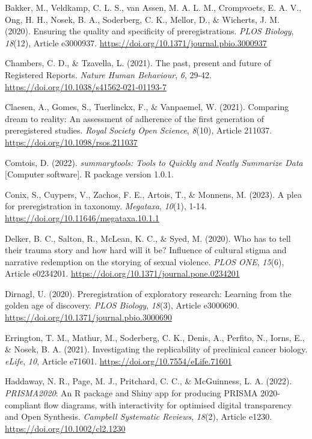 \documentclass[authordate, meta]{jote-new-article}
\begin{document}
	\indent Bakker, M., Veldkamp, C. L. S., van Assen, M. A. L. M., Crompvoets, E. A. V., Ong, H. H., Nosek, B. A., Soderberg, C. K., Mellor, D., \& Wicherts, J. M. (2020). Ensuring the quality and specificity of preregistrations. \emph{PLOS Biology}, \emph{18}(12), Article e3000937. \url{https://doi.org/10.1371/journal.pbio.3000937}



	Chambers, C. D., \& Tzavella, L. (2021). The past, present and future of Registered Reports. \emph{Nature Human Behaviour}, \emph{6}, 29-42. \url{https://doi.org/10.1038/s41562-021-01193-7}



	Claesen, A., Gomes, S., Tuerlinckx, F., \& Vanpaemel, W. (2021). Comparing dream to reality: An assessment of adherence of the first generation of preregistered studies. \emph{Royal Society Open Science}, \emph{8}(10), Article 211037. \url{https://doi.org/10.1098/rsos.211037}



	Comtois, D. (2022). \emph{summarytools: Tools to Quickly and Neatly Summarize Data} [Computer software]. R package version 1.0.1.



	Conix, S., Cuypers, V., Zachos, F. E., Artois, T., \& Monnens, M. (2023). A plea for preregistration in taxonomy. \emph{Megataxa}, \emph{10}(1), 1-14. \url{https://doi.org/10.11646/megataxa.10.1.1}



	Delker, B. C., Salton, R., McLean, K. C., \& Syed, M. (2020). Who has to tell their trauma story and how hard will it be? Influence of cultural stigma and narrative redemption on the storying of sexual violence. \emph{PLOS ONE}, \emph{15}(6), Article e0234201. \url{https://doi.org/10.1371/journal.pone.0234201}



	Dirnagl, U. (2020). Preregistration of exploratory research: Learning from the golden age of discovery. \emph{PLOS Biology}, \emph{18}(3), Article e3000690. \url{https://doi.org/10.1371/journal.pbio.3000690}



	Errington, T. M., Mathur, M., Soderberg, C. K., Denis, A., Perfito, N., Iorns, E., \& Nosek, B. A. (2021). Investigating the replicability of preclinical cancer biology. \emph{eLife}, \emph{10}, Article e71601. \url{https://doi.org/10.7554/eLife.71601}



	Haddaway, N. R., Page, M. J., Pritchard, C. C., \& McGuinness, L. A. (2022). \emph{PRISMA2020}: An R package and Shiny app for producing PRISMA 2020-compliant flow diagrams, with interactivity for optimised digital transparency and Open Synthesis. \emph{Campbell Systematic Reviews}, \emph{18}(2), Article e1230. \url{https://doi.org/10.1002/cl2.1230}
\end{document}
